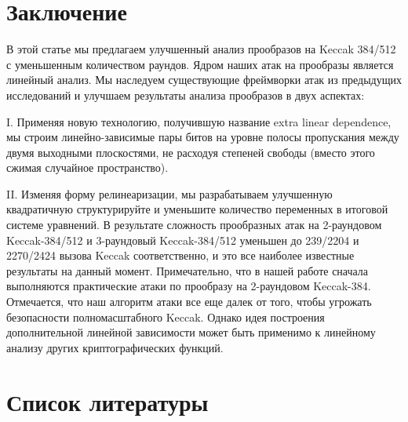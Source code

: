 \documentclass[utf8,14pt,a4paper,oneside,russian]{book}
\begin{document}
\newpage
\section{Заключение}

В этой статье мы предлагаем улучшенный анализ прообразов на Keccak 384/512 с
уменьшенным количеством раундов. Ядром наших атак на прообразы является линейный анализ. Мы наследуем существующие
фреймворки атак из предыдущих исследований и улучшаем
результаты анализа прообразов в двух аспектах:

I. Применяя новую технологию, получившую название extra linear dependence, мы строим
линейно-зависимые пары битов на уровне полосы пропускания между двумя выходными плоскостями, не расходуя
степеней свободы (вместо этого сжимая случайное пространство).

II. Изменяя форму релинеаризации, мы разрабатываем улучшенную квадратичную
структурируйте и уменьшите количество переменных в итоговой системе уравнений.
В результате сложность прообразных атак на 2-раундовом Keccak-384/512
и 3-раундовый Keccak-384/512 уменьшен до 239/2204 и 2270/2424 вызова Keccak
соответственно, и это все наиболее известные результаты на данный момент. Примечательно, что в нашей работе
сначала выполняются практические атаки по прообразу на 2-раундовом Keccak-384.
Отмечается, что наш алгоритм атаки все еще далек от того, чтобы угрожать безопасности
полномасштабного Keccak. Однако идея построения дополнительной линейной зависимости
может быть применимо к линейному анализу других криптографических функций.

\newpage
\section{Список литературы}
\end{document}
